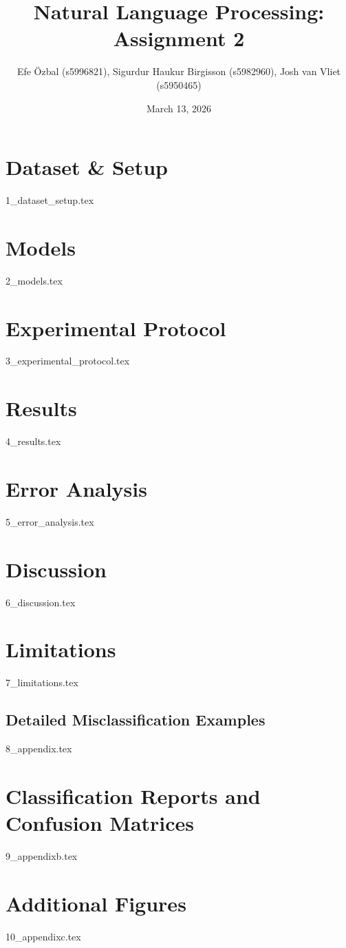 \documentclass{article}
\title{\textbf{Natural Language Processing: Assignment 2}}
\author{Efe Özbal (s5996821), Sigurdur Haukur Birgisson (s5982960), Josh van Vliet (s5950465)}
\date{March 13, 2026}
\begin{document}
\maketitle

\section{Dataset \& Setup}
\label{sec:dataset}
{1_dataset_setup.tex}



\section{Models}
{2_models.tex}

\section{Experimental Protocol}
{3_experimental_protocol.tex}

\section{Results}
\label{sec:results}
{4_results.tex}

\section{Error Analysis}
{5_error_analysis.tex}

\section{Discussion}
{6_discussion.tex}

\section{Limitations}
{7_limitations.tex}



\newpage

\appendix
\newpage
{}
\begin{landscape}
\section{Detailed Misclassification Examples}
\label{app:misclass}
{8_appendix.tex}

\clearpage

\end{landscape}
\restoregeometry

\section{Classification Reports and Confusion Matrices}
\label{app:reports}
{9_appendixb.tex}

\section{Additional Figures}
\label{app:additional_figures}
{10_appendixc.tex}
\end{document}
